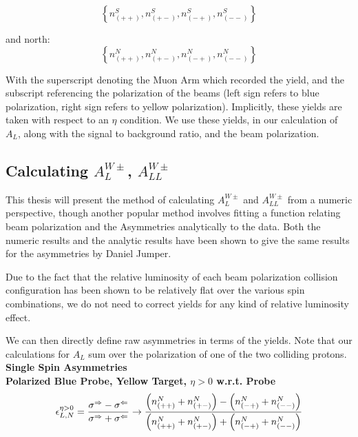 \begin{equation}
  \left\{
  n_{\left(++\right)}^S,
  n_{\left(+-\right)}^S,
  n_{\left(-+\right)}^S,
  n_{\left(--\right)}^S
  \right\}
  \label{eq:muon_yield_north}
\end{equation}

and north:
\begin{equation}
  \left\{
  n_{\left(++\right)}^N,
  n_{\left(+-\right)}^N,
  n_{\left(-+\right)}^N,
  n_{\left(--\right)}^N
  \right\}
  \label{eq:muon_yield_south}
\end{equation}

With the superscript denoting the Muon Arm which recorded the yield, and the
subscript referencing the polarization of the beams (left sign refers to blue
polarization, right sign refers to yellow polarization). Implicitly, these
yields are taken with respect to an $\eta$ condition. We use these yields, in
our calculation of $A_L$, along with the signal to background ratio, and the
beam polarization.

\subsection{Calculating $A_L^{W\pm}$, $A_{LL}^{W\pm}$}

This thesis will present the method of calculating $A_L^{W\pm}$ and
$A_{LL}^{W\pm}$ from a numeric perspective, though another popular method
involves fitting a function relating beam polarization and the Asymmetries
analytically to the data. Both the numeric results and the analytic results have
been shown to give the same results for the asymmetries by Daniel Jumper.

Due to the fact that the relative luminosity of each beam polarization collision
configuration has been shown to be relatively flat over the various spin
combinations, we do not need to correct yields for any kind of relative
luminosity effect. 

We can then directly define raw asymmetries in terms of the yields. Note that
our calculations for $A_L$ sum over the polarization of one of the two colliding
protons.\\

\noindent\textbf{Single Spin Asymmetries}\\

\noindent\textbf{Polarized Blue Probe, Yellow Target, $\eta > 0$ w.r.t. Probe}
\begin{equation}
  {\epsilon_{L,N}^{\eta > 0}} 
  = 
  { 
    {\sigma^\Rightarrow-\sigma^\Leftarrow} 
    \over 
    {\sigma^\Rightarrow+\sigma^\Leftarrow} 
  } 
  \to 
  {
    {\left(n_{(++)}^N+n_{(+-)}^N\right)-\left(n_{(-+)}^N+n_{(--)}^N\right)}
    \over
    {\left(n_{(++)}^N+n_{(+-)}^N\right)+\left(n_{(-+)}^N+n_{(--)}^N\right)}
  }
  \label{eq:al_blue_probe_pos_rap}
\end{equation}\\

